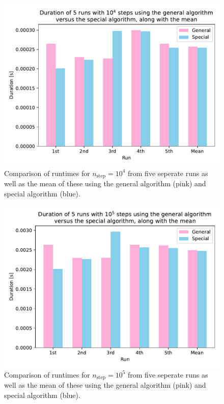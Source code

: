 \documentclass[english,notitlepage]{revtex4-1}  %
\begin{document}
\begin{figure}[h!]
    \centering 
    \includegraphics[scale=0.80]{../data/runtime_comparison_10000.pdf} %
    \caption{Comparison of runtimes for $n_\text{step} = 10^4$ from five seperate runs as well as the mean of these using the general algorithm (pink) and special algorithm (blue).}
    \label{timing 4}
\end{figure}

\begin{figure}[h!]
    \centering 
    \includegraphics[scale=0.80]{../data/runtime_comparison_100000.pdf} %
    \caption{Comparison of runtimes for $n_\text{step} = 10^5$ from five seperate runs as well as the mean of these using the general algorithm (pink) and special algorithm (blue).}
    \label{timing 5}
\end{figure}
\end{document}
